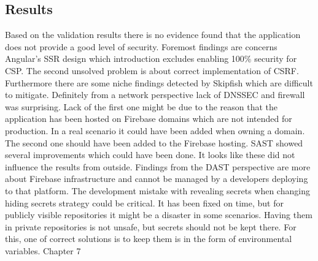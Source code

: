 \documentclass{article} %
\begin{document}
\subsection{Results}
Based on the validation results there is no evidence found that the application does not provide a good level of security. Foremost findings are concerns Angular's SSR design which introduction excludes enabling 100\% security for CSP. The second unsolved problem is about correct implementation of CSRF. Furthermore there are some niche findings detected by Skipfish which are difficult to mitigate. Definitely from a network perspective lack of DNSSEC and firewall was surprising. Lack of the first one might be due to the reason that the application has been hosted on Firebase domains which are not intended for production. In a real scenario it could have been added when owning a domain. The second one should have been added to the Firebase hosting. SAST showed several improvements which could have been done. It looks like these did not influence the results from outside. Findings from the DAST perspective are more about Firebase infrastructure and cannot be managed by a developers deploying to that platform. The development mistake with revealing secrets when changing hiding secrets strategy could be critical. It has been fixed on time, but for publicly visible repositories it might be a disaster in some scenarios. Having them in private repositories is not unsafe, but secrets should not be kept there. For this, one of correct solutions is to keep them is in the form of environmental variables.
\newpage
\huge Chapter 7
\end{document}
